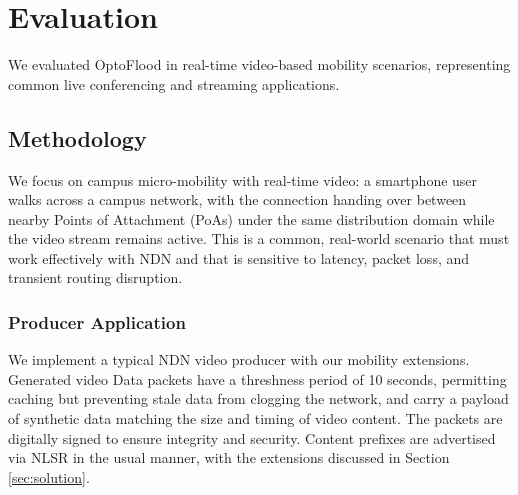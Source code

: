 \documentclass[10pt,conference]{IEEEtran}
\begin{document}
\section{Evaluation}
\label{sec:evaluation}

We evaluated OptoFlood in real-time video-based mobility scenarios, representing common live conferencing and streaming applications.

\subsection{Methodology}

We focus on campus micro-mobility with real-time video: a smartphone user walks across a campus network, with the connection handing over between nearby Points of Attachment (PoAs) under the same distribution domain while the video stream remains active. This is a common, real-world scenario that must work effectively with NDN and that is sensitive to latency, packet loss, and transient routing disruption.

% 

\subsubsection{Producer Application}
We implement a typical NDN video producer with our mobility extensions.
Generated video Data packets have a threshness period of 10 seconds, permitting caching but preventing stale data from clogging the network, and carry a payload of synthetic data matching the size and timing of video content. The packets are digitally signed to ensure integrity and security.
Content prefixes are advertised via NLSR in the usual manner, with the extensions discussed in Section \ref{sec:solution}.
\end{document}
